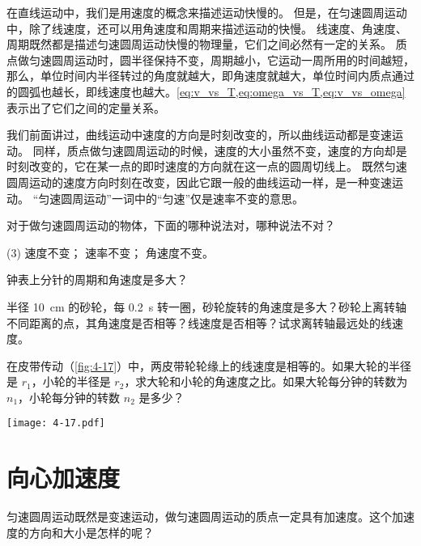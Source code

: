 在直线运动中，我们是用速度的概念来描述运动快慢的。
但是，在匀速圆周运动中，除了线速度，还可以用角速度和周期来描述运动的快慢。
线速度、角速度、周期既然都是描述匀速圆周运动快慢的物理量，它们之间必然有一定的关系。
质点做匀速圆周运动时，圆半径保持不变，周期越小，它运动一周所用的时间越短，那么，单位时间内半径转过的角度就越大，即角速度就越大，单位时间内质点通过的圆弧也越长，即线速度也越大。\cref{eq:v_vs_T,eq:omega_vs_T,eq:v_vs_omega} 表示出了它们之间的定量关系。

我们前面讲过，曲线运动中速度的方向是时刻改变的，所以曲线运动都是变速运动。
同样，质点做匀速圆周运动的时候，速度的大小虽然不变，速度的方向却是时刻改变的，它在某一点的即时速度的方向就在这一点的圆周切线上。
既然匀速圆周运动的速度方向时刻在改变，因此它跟一般的曲线运动一样，是一种变速运动。
“匀速圆周运动”一词中的“匀速”仅是速率不变的意思。

\begin{Practice}
\begin{question}
  \item 对于做匀速圆周运动的物体，下面的哪种说法对，哪种说法不对？
  \begin{tasks}(3)
    \task 速度不变；
    \task 速率不变；
    \task 角速度不变。
  \end{tasks}
  \item 钟表上分针的周期和角速度是多大？
  \item 半径 \qty{10}{cm} 的砂轮，每 \qty{0.2}{s} 转一圈，砂轮旋转的角速度是多大？砂轮上离转轴不同距离的点，其角速度是否相等？线速度是否相等？试求离转轴最远处的线速度。
  \item 在皮带传动（\cref{fig:4-17}）中，两皮带轮轮缘上的线速度是相等的。如果大轮的半径是 $r_1$，小轮的半径是 $r_2$，求大轮和小轮的角速度之比。如果大轮每分钟的转数为 $n_1$，小轮每分钟的转数 $n_2$ 是多少？
  \begin{figurehere}
    \begin{minipage}{\linewidth}\centering
      \texttt{[image: 4-17.pdf]}
      \caption{}\label{fig:4-17}
    \end{minipage}
  \end{figurehere}
\end{question}
\end{Practice}

\section{向心加速度}
匀速圆周运动既然是变速运动，做匀速圆周运动的质点一定具有加速度。这个加速度的方向和大小是怎样的呢？


